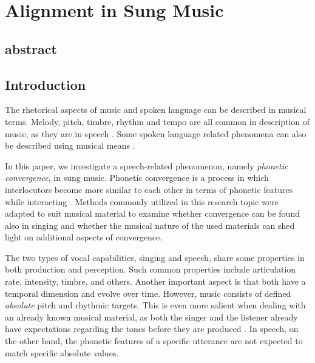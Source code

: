\chapter{Alignment in Sung Music}
\label{chap:alignment_in_sung_music}



\section{abstract}
\label{sec:abstract}

\section{Introduction}
\label{sec:introduction}

The rhetorical aspects of music and spoken language can be described in musical terms.
Melody, pitch, timbre, rhythm and tempo are all common in description of music, as they are in speech \citep{Molino2000toward, Jackendoff2009parallels}.
Some spoken language related phenomena can also be described using musical means \citep[as in][]{Day2013speech}.

In this paper, we investigate a speech-related phenomenon, namely \emph{phonetic convergence}, in sung music.
Phonetic convergence is a process in which interlocutors become more similar to each other in terms of phonetic features while interacting \citep{Pardo2006phonetic, Kim2011phonetic}.
Methods commonly utilized in this research topic were adapted to suit musical material to examine whether convergence can be found also in singing and whether the musical nature of the used materials can shed light on additional aspects of convergence.

The two types of vocal capabilities, singing and speech, share some properties in both production and perception.
Such common properties include articulation rate, intensity, timbre, and others.
Another important aspect is that both have a temporal dimension and evolve over time.
However, music consists of defined \emph{absolute} pitch and rhythmic targets.
This is even more salient when dealing with an already known musical material, as both the singer and the listener already have expectations regarding the tones before they are produced \citep{Meyer2008emotion}.
In speech, on the other hand, the phonetic features of a specific utterance are not expected to match specific absolute values.

